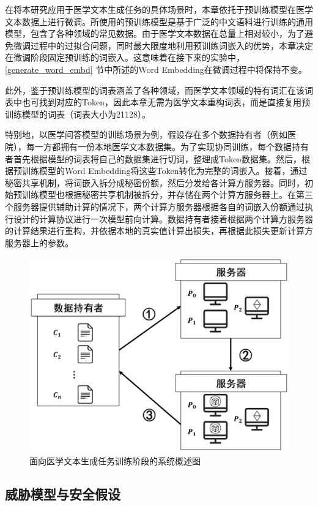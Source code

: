 在将本研究应用于医学文本生成任务的具体场景时，本章依托于预训练模型在医学文本数据上进行微调。所使用的预训练模型是基于广泛的中文语料进行训练的通用模型，包含了各种领域的常见数据。由于医学文本数据在总量上相对较小，为了避免微调过程中的过拟合问题，同时最大限度地利用预训练词嵌入的优势，本章决定在微调阶段固定预训练的词嵌入。这意味着在接下来的实验中，\ref{generate_word_embd} 节中所述的Word Embedding在微调过程中将保持不变。

此外，鉴于预训练模型的词表涵盖了各种领域，而医学文本领域的特有词汇在该词表中也可找到对应的Token，因此本章无需为医学文本重构词表，而是直接复用预训练模型的词表（词表大小为21128）。

特别地，以医学问答模型的训练场景为例，假设存在多个数据持有者（例如医院），每一方都拥有一份本地医学文本数据集。为了实现协同训练，每个数据持有者首先根据模型的词表将自己的数据集进行切词，整理成Token数据集。然后，根据预训练模型的Word Embedding将这些Token转化为完整的词嵌入。接着，通过秘密共享机制，将词嵌入拆分成秘密份额，然后分发给各计算方服务器。同时，初始预训练模型也根据秘密共享机制被拆分，并存储在两个计算方服务器上。在第三个服务器提供辅助计算的情况下，两个计算方服务器根据各自的词嵌入份额通过执行设计的计算协议进行一次模型前向计算。数据持有者接着根据两个计算方服务器的计算结果进行重构，并依据本地的真实值计算出损失，再根据此损失更新计算方服务器上的参数。

\begin{figure}[h]
	\centering
	\includegraphics[width=0.75\linewidth]{figures/Chap4_System_Info.png}
	\caption{面向医学文本生成任务训练阶段的系统概述图}
	\label{Chap4_System_Info}
\end{figure}

\subsection{威胁模型与安全假设} \label{chap4ThreatModel}

